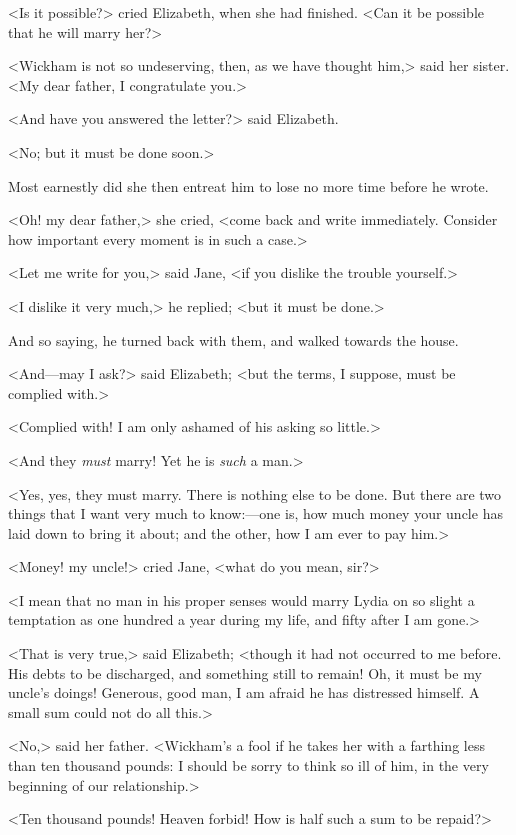 <Is it possible?> cried Elizabeth, when she had finished. <Can it be possible that he will marry her?>

<Wickham is not so undeserving, then, as we have thought him,> said her sister. <My dear father, I congratulate you.>

<And have you answered the letter?> said Elizabeth.

<No; but it must be done soon.>

Most earnestly did she then entreat him to lose no more time before he wrote.

<Oh! my dear father,> she cried, <come back and write immediately. Consider how important every moment is in such a case.>

<Let me write for you,> said Jane, <if you dislike the trouble yourself.>

<I dislike it very much,> he replied; <but it must be done.>

And so saying, he turned back with them, and walked towards the house.

<And—may I ask?> said Elizabeth; <but the terms, I suppose, must be complied with.>

<Complied with! I am only ashamed of his asking so little.>

<And they \textit{must} marry! Yet he is \textit{such} a man.>

<Yes, yes, they must marry. There is nothing else to be done. But there are two things that I want very much to know:—one is, how much money your uncle has laid down to bring it about; and the other, how I am ever to pay him.>

<Money! my uncle!> cried Jane, <what do you mean, sir?>

<I mean that no man in his proper senses would marry Lydia on so slight a temptation as one hundred a year during my life, and fifty after I am gone.>

<That is very true,> said Elizabeth; <though it had not occurred to me before. His debts to be discharged, and something still to remain! Oh, it must be my uncle's doings! Generous, good man, I am afraid he has distressed himself. A small sum could not do all this.>

<No,> said her father. <Wickham's a fool if he takes her with a farthing less than ten thousand pounds: I should be sorry to think so ill of him, in the very beginning of our relationship.>

<Ten thousand pounds! Heaven forbid! How is half such a sum to be repaid?>

